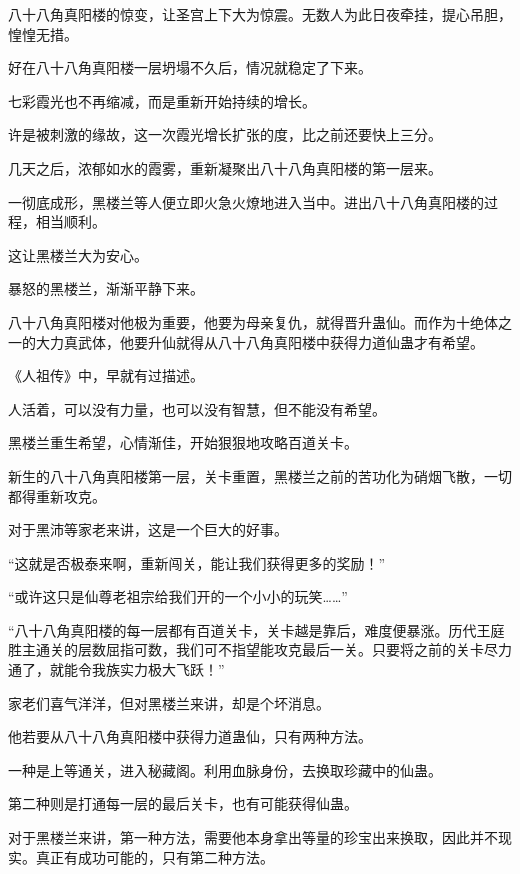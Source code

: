 
\begin{this_body}



八十八角真阳楼的惊变，让圣宫上下大为惊震。无数人为此日夜牵挂，提心吊胆，惶惶无措。

好在八十八角真阳楼一层坍塌不久后，情况就稳定了下来。

七彩霞光也不再缩减，而是重新开始持续的增长。

许是被刺激的缘故，这一次霞光增长扩张的度，比之前还要快上三分。

几天之后，浓郁如水的霞雾，重新凝聚出八十八角真阳楼的第一层来。

一彻底成形，黑楼兰等人便立即火急火燎地进入当中。进出八十八角真阳楼的过程，相当顺利。

这让黑楼兰大为安心。

暴怒的黑楼兰，渐渐平静下来。

八十八角真阳楼对他极为重要，他要为母亲复仇，就得晋升蛊仙。而作为十绝体之一的大力真武体，他要升仙就得从八十八角真阳楼中获得力道仙蛊才有希望。

《人祖传》中，早就有过描述。

人活着，可以没有力量，也可以没有智慧，但不能没有希望。

黑楼兰重生希望，心情渐佳，开始狠狠地攻略百道关卡。

新生的八十八角真阳楼第一层，关卡重置，黑楼兰之前的苦功化为硝烟飞散，一切都得重新攻克。

对于黑沛等家老来讲，这是一个巨大的好事。

“这就是否极泰来啊，重新闯关，能让我们获得更多的奖励！”

“或许这只是仙尊老祖宗给我们开的一个小小的玩笑……”

“八十八角真阳楼的每一层都有百道关卡，关卡越是靠后，难度便暴涨。历代王庭胜主通关的层数屈指可数，我们可不指望能攻克最后一关。只要将之前的关卡尽力通了，就能令我族实力极大飞跃！”

家老们喜气洋洋，但对黑楼兰来讲，却是个坏消息。

他若要从八十八角真阳楼中获得力道蛊仙，只有两种方法。

一种是上等通关，进入秘藏阁。利用血脉身份，去换取珍藏中的仙蛊。

第二种则是打通每一层的最后关卡，也有可能获得仙蛊。

对于黑楼兰来讲，第一种方法，需要他本身拿出等量的珍宝出来换取，因此并不现实。真正有成功可能的，只有第二种方法。


\end{this_body}
